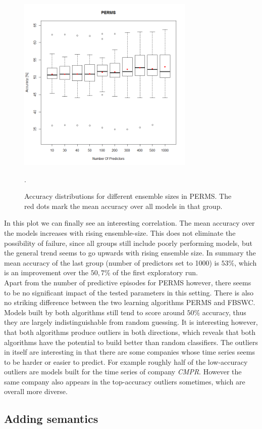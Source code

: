 \begin{figure}[h]
	\centering
  	\includegraphics[width=0.75\textwidth]{permsNumPredictors}
	\caption{Accuracy distributions for different ensemble sizes in PERMS. The red dots mark the mean accuracy over all models in that group.}.
	\label{fig_permsNumPredictors}
\end{figure}

In this plot we can finally see an interesting correlation. The mean accuracy over the models increases with rising ensemble-size. This does not eliminate the possibility of failure, since all groups still include poorly performing models, but the general trend seems to go upwards with rising ensemble size. In summary the mean accuracy of the last group (number of predictors set to 1000) is $53\%$, which is an improvement over the $50,7\%$ of the first exploratory run. \\
Apart from the number of predictive episodes for PERMS however, there seems to be no significant impact of the tested parameters in this setting. There is also no striking difference between the two learning algorithms PERMS and FBSWC. Models built by both algorithms still tend to score around $50\%$ accuracy, thus they are largely indistinguishable from random guessing. It is interesting however, that both algorithms produce outliers in both directions, which reveals that both algorithms have the potential to build better than random classifiers. The outliers in itself are interesting in that there are some companies whose time series seems to be harder or easier to predict. For example roughly half of the low-accuracy outliers are models built for the time series of company \textit{CMPR}. However the same company also appears in the top-accuracy outliers sometimes, which are overall more diverse.

\subsection{Adding semantics}

